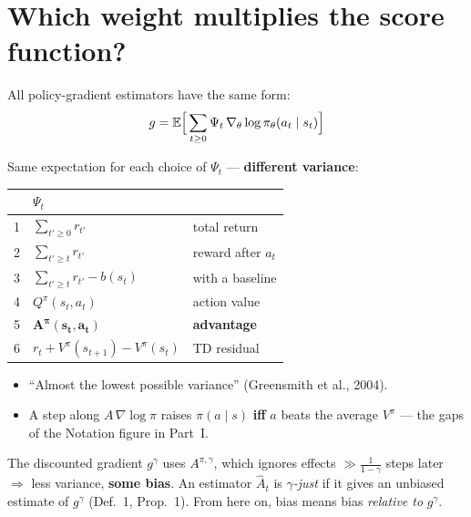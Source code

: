 \section{Which weight multiplies the score function?}

All policy-gradient estimators have the same form:
\begin{gather*}
  g = \mathbb{E}\Big[\sum_{t\ge0} \Psi_t\,\nabla_\theta\log\pi_\theta(a_t\mid s_t)\Big]
\end{gather*}

\begin{minipage}[c]{0.5\linewidth}
Same expectation for each choice of $\Psi_t$ --- \textbf{different variance}:\par\vspace{2pt}
\small
\begin{tabular}{r l l}
\toprule
 & $\Psi_t$ & \\
\midrule
1 & $\sum_{t'\ge0} r_{t'}$ & total return \\
2 & $\sum_{t'\ge t} r_{t'}$ & reward after $a_t$ \\
3 & $\sum_{t'\ge t} r_{t'} - b(s_t)$ & with a baseline \\
4 & $Q^\pi(s_t,a_t)$ & action value \\
5 & {\color{AtlasCool}$\boldsymbol{A^\pi(s_t,a_t)}$} & {\color{AtlasCool}\textbf{advantage}} \\
6 & $r_t + V^\pi(s_{t+1}) - V^\pi(s_t)$ & TD residual \\
\bottomrule
\end{tabular}
\end{minipage}\hfill
\begin{minipage}[c]{0.46\linewidth}
\begin{keybox}[title={Why the advantage}]
\begin{itemize}
  \item ``Almost the lowest possible variance'' (Greensmith et al., 2004).
  \item A step along $A\,\nabla\log\pi$ raises $\pi(a\mid s)$ \textbf{iff} $a$ beats the average $V^\pi$ --- the gaps of the Notation figure in Part~I.
\end{itemize}
\end{keybox}
\end{minipage}

\begin{slatebox}[title={The discount as a knob}]
The discounted gradient $g^\gamma$ uses $A^{\pi,\gamma}$, which ignores effects $\gg\frac{1}{1-\gamma}$ steps later $\Rightarrow$ less variance, \textbf{some bias}. An estimator $\hat A_t$ is \emph{$\gamma$-just} if it gives an unbiased estimate of $g^\gamma$ (Def.~1, Prop.~1). From here on, bias means bias \emph{relative to} $g^\gamma$.
\end{slatebox}

